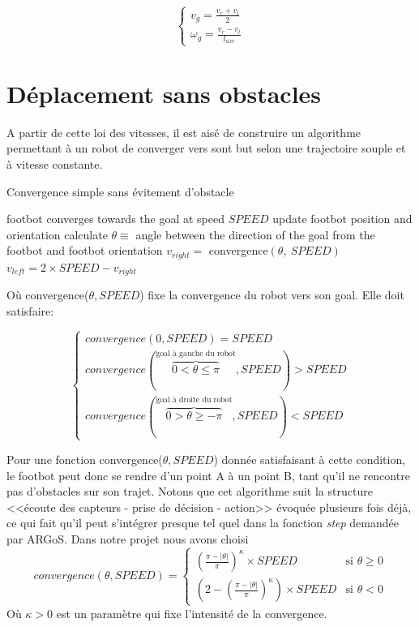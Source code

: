 \begin{equation}
\begin{cases}
v_g=\frac{v_r+v_l}{2}\\
\omega_g=\frac{v_r-v_l}{l_{axe}}
\end{cases}
\end{equation}

\section{Déplacement sans obstacles\label{sec:noObstacles}}

A partir de cette loi des vitesses, il est aisé de construire un algorithme permettant à un robot de converger vers sont but selon une trajectoire souple et à vitesse constante.

\begin{algorithm}
\caption{Convergence simple sans évitement d'obstacle}
\label{simpleConvergence}
\begin{algorithmic}
  \ENSURE footbot converges towards the goal at speed \(SPEED\)
    \STATE update footbot position and orientation
    \STATE calculate \( \theta \equiv\) angle between the direction of the goal from the footbot and footbot orientation
    \STATE \( v_{right} = \) convergence\( (\theta,\:SPEED) \)
    \STATE \( v_{left} = 2 \times SPEED-v_{right}\) 
  \ENDWHILE
\end{algorithmic}
\end{algorithm}

Où convergence($\theta, SPEED$) fixe la convergence du robot vers son goal. Elle doit satisfaire:

\begin{equation}
  \begin{cases}
    convergence(0,SPEED)=SPEED\\
    convergence(\overset{\text{goal à gauche du robot}}{\overbrace{0<\theta\leq\pi}},SPEED)>SPEED\\
    convergence(\overset{\text{goal à droite du robot}}{\overbrace{0>\theta\geq-\pi}},SPEED)<SPEED
  \end{cases}
\end{equation}

Pour une fonction convergence($\theta, SPEED$) donnée satisfaisant à cette condition, le footbot peut donc se rendre d'un point A à un point B, tant qu'il ne rencontre pas d'obstacles sur son trajet. Notons que cet algorithme suit la structure <<écoute des capteurs - prise de décision - action>> évoquée plusieurs fois déjà, ce qui fait qu'il peut s'intégrer presque tel quel dans la fonction \emph{step} demandée par ARGoS. Dans notre projet nous avons choisi
\[
convergence(\theta, SPEED)=
\begin{cases}
      { \left( \frac{\pi- \lvert \theta \rvert }{\pi} \right)}^{\kappa} \times SPEED & \text{si } \theta \geq 0\\
      \left( 2 - { \left( \frac{\pi- \lvert \theta \rvert }{\pi} \right) }^{\kappa} \right) \times SPEED & \text{si } \theta < 0
\end{cases}
\]
Où $\kappa > 0$ est un paramètre qui fixe l'intensité de la convergence.

